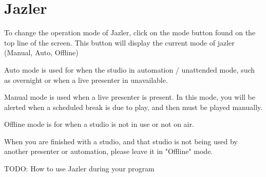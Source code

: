 % 

\chapter{Jazler}




To change the operation mode of Jazler, click on the mode button found
on the top line of the screen. This button will display the current mode
of jazler (Manual, Auto, Offline)

Auto mode is used for when the studio in automation / unattended mode, such
as overnight or when a live presenter in unavailable.


Manual mode is used when a live presenter is present. In this mode, you will be
alerted when a scheduled break is due to play, and then must be played
manually.


Offline mode is for when a studio is not in use or not on air.


When you are finished with a studio, and that studio is not being used
by another presenter or automation, please leave it in "Offline" mode.


TODO: How to use Jazler during your program

% 
